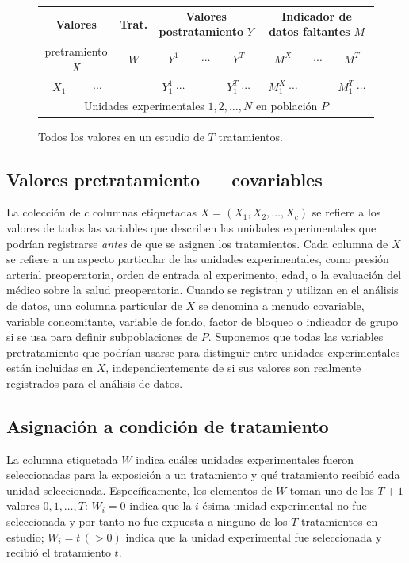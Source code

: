\documentclass[12pt,a4paper]{article}
\begin{document}
\begin{figure}[ht]
\centering
\renewcommand{\arraystretch}{1.2}
\begin{tabular}{|c|c|c|c|c|c|c|c|c|}
\hline
\multicolumn{2}{|c|}{\textbf{Valores}} &
\textbf{Trat.} &
\multicolumn{3}{c|}{\textbf{Valores postratamiento } $Y$} &
\multicolumn{3}{c|}{\textbf{Indicador de datos faltantes } $M$} \\
\multicolumn{2}{|c|}{pretramiento $X$} & $W$ &
$Y^1$ & $\cdots$ & $Y^T$ &
$M^X$ & $\cdots$ & $M^T$ \\
\hline
$X_1$ & $\cdots$ & & $Y^1_1\;\cdots$ & & $Y^T_1\;\cdots$ &
$M^X_1\;\cdots$ & & $M^T_1\;\cdots$ \\
\hline
\multicolumn{9}{|c|}{Unidades experimentales $1, 2, \ldots, N$ en población $P$} \\
\hline
\end{tabular}
\caption{Todos los valores en un estudio de $T$ tratamientos.}
\end{figure}

\subsection{Valores pretratamiento --- covariables}

La colección de $c$ columnas etiquetadas $X = (X_1, X_2, \ldots, X_c)$ se refiere a los
valores de todas las variables que describen las unidades experimentales que podrían
registrarse \textit{antes} de que se asignen los tratamientos. Cada columna de $X$ se
refiere a un aspecto particular de las unidades experimentales, como presión arterial
preoperatoria, orden de entrada al experimento, edad, o la evaluación del médico sobre la
salud preoperatoria. Cuando se registran y utilizan en el análisis de datos, una columna
particular de $X$ se denomina a menudo covariable, variable concomitante, variable de
fondo, factor de bloqueo o indicador de grupo si se usa para definir subpoblaciones de
$P$. Suponemos que todas las variables pretratamiento que podrían usarse para distinguir
entre unidades experimentales están incluidas en $X$, independientemente de si sus valores
son realmente registrados para el análisis de datos.

\subsection{Asignación a condición de tratamiento}

La columna etiquetada $W$ indica cuáles unidades experimentales fueron seleccionadas para
la exposición a un tratamiento y qué tratamiento recibió cada unidad seleccionada.
Específicamente, los elementos de $W$ toman uno de los $T+1$ valores
$0, 1, \ldots, T$: $W_i = 0$ indica que la $i$-ésima unidad experimental no fue
seleccionada y por tanto no fue expuesta a ninguno de los $T$ tratamientos en estudio;
$W_i = t\,(>0)$ indica que la unidad experimental fue seleccionada y recibió el
tratamiento $t$.
\end{document}
